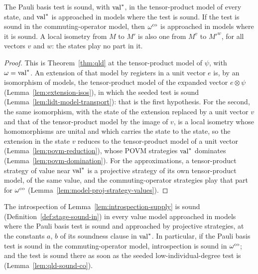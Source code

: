 \begin{lemma}
\label{lem:qld-sound-in-tensor}
\leanok
The Pauli basis test is sound, with $\mathrm{val}^*$, in the tensor-product model of every state, and
$\mathrm{val}^*$ is approached in models where the test is sound. If the test is sound in the
commuting-operator model, then $\omega^{\mathrm{co}}$ is approached in models where it is sound. A local
isometry from $M$ to $M'$ is also one from $M^{v}$ to $M'^{w}$, for all vectors $v$ and $w$: the
states play no part in it.
\end{lemma}

\begin{proof}
\leanok
This is Theorem~\ref{thm:qld} at the tensor-product model of $\psi$, with $\omega = \mathrm{val}^*$. An
extension of that model by registers in a unit vector $e$ is, by an isomorphism of models, the
tensor-product model of the expanded vector $e \otimes \psi$ (Lemma~\ref{lem:extension-isos}), in
which the seeded test is sound (Lemma~\ref{lem:lidt-model-transport}): that is the first hypothesis.
For the second, the same isomorphism, with the state of the extension replaced by a unit vector $v$
and that of the tensor-product model by the image of $v$, is a local isometry whose homomorphisms
are unital and which carries the state to the state, so the extension in the state $v$ reduces to
the tensor-product model of a unit vector (Lemma~\ref{lem:povm-reduction}), whose POVM strategies
$\mathrm{val}^*$ dominates (Lemma~\ref{lem:povm-domination}). For the approximations, a tensor-product
strategy of value near $\mathrm{val}^*$ is a projective strategy of its own tensor-product model, of the
same value, and the commuting-operator strategies play that part for $\omega^{\mathrm{co}}$
(Lemma~\ref{lem:model-proj-strategy-values}).
\end{proof}

\begin{theorem}
\label{thm:intro-sound-co}
\leanok
The introspection of Lemma~\ref{lem:introspection-supply} is sound
(Definition~\ref{def:stage-sound-in}) in every value model approached in models where the Pauli
basis test is sound and approached by projective strategies, at the constants $a$, $b$ of its
soundness clause in $\mathrm{val}^*$. In particular, if the Pauli basis test is sound in the
commuting-operator model, introspection is sound in $\omega^{\mathrm{co}}$; and the test is sound there as soon
as the seeded low-individual-degree test is (Lemma~\ref{lem:qld-sound-co}).
\end{theorem}

